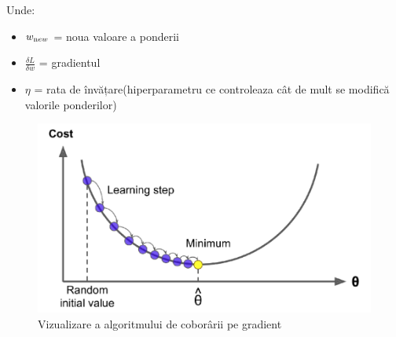 Unde: 

\begin{itemize}
    \item $w_{\text new}$ = noua valoare a ponderii
    \item $\frac{\delta L}{\delta w}$ = gradientul 
    \item $\eta$ = rata de învățare(hiperparametru ce controleaza cât de mult se modifică valorile ponderilor)
\end{itemize}

\begin{figure}[h]
         \centering 
         \includegraphics[width=.75\linewidth]{images/gradient-descent.png}
         \captionsetup{font=footnotesize}
         \caption{Vizualizare a algoritmului de coborârii pe gradient \cite{GD}}
\end{figure}

    

